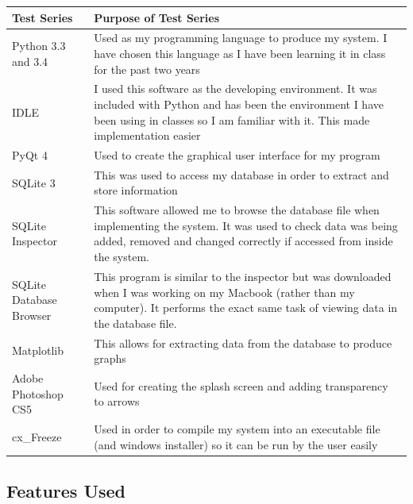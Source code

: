 \begin{center}
    \begin{tabular}{|p{4cm}|p{6cm}|}
        \hline
        \textbf{Test Series} & \textbf{Purpose of Test Series} \\ \hline
        Python 3.3 and 3.4 & Used as my programming language to produce my system. I have chosen this language as I have been learning it in class for the past two years \\ \hline
        IDLE & I used this software as the developing environment. It was included with Python and has been the environment I have been using in classes so I am familiar with it. This made implementation easier\\ \hline
        PyQt 4 & Used to create the graphical user interface for my program \\ \hline
        SQLite 3 & This was used to access my database in order to extract and store information \\ \hline
        SQLite Inspector & This software allowed me to browse the database file when implementing the system. It was used to check data was being added, removed and changed correctly if accessed from inside the system. \\ \hline
        SQLite Database Browser & This program is similar to the inspector but was downloaded when I was working on my Macbook (rather than my computer). It performs the exact same task of viewing data in the database file. \\ \hline
        Matplotlib & This allows for extracting data from the database to produce graphs \\ \hline
        Adobe Photoshop CS5 & Used for creating the splash screen and adding transparency to arrows \\ \hline
        cx\_Freeze & Used in order to compile my system into an executable file (and windows installer) so it can be run by the user easily \\ \hline
    \end{tabular}
\end{center}

\subsection{Features Used}

